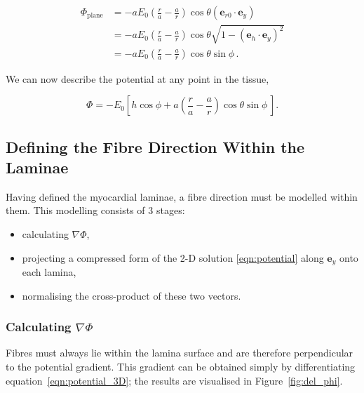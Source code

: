  \begin{align}
    \Phi_{\text{plane}} &= -aE_0\left( \frac{r}{a} - \frac{a}{r} \right) \cos \theta \left(\mathbf{e}_{r0} \cdot \mathbf{e}_y \right) \\
    &= -aE_0\left( \frac{r}{a} - \frac{a}{r} \right) \cos \theta \sqrt{ 1 - \left( \mathbf{e}_h \cdot \mathbf{e}_y \right)^2 } \\
    &= -aE_0\left( \frac{r}{a} - \frac{a}{r} \right) \cos \theta \sin \phi \, .
  \end{align}
  
  We can now describe the potential at any point in the tissue,
  
  \begin{equation}
    \Phi = -E_0\left[ h \cos \phi + a \left( \frac{r}{a} - \frac{a}{r} \right) \cos \theta \sin \phi \, \right].
    \label{eqn:potential_3D}
  \end{equation}
  

\subsection{Defining the Fibre Direction Within the Laminae}
\label{sec:defining_the_fibre_direction_within_the_laminae}
  Having defined the myocardial laminae, a fibre direction must be modelled within them. This modelling consists of 3 stages:
  
  \begin{itemize}
    \item calculating $\nabla\Phi$,
    \item projecting a compressed form of the 2-D solution \ref{eqn:potential} along $\mathbf{e}_y$ onto each lamina,
    \item normalising the cross-product of these two vectors.
  \end{itemize}
  
  \subsubsection{Calculating $\nabla\Phi$}
  \label{sub:calculating_nablaphi}
    Fibres must always lie within the lamina surface and are therefore perpendicular to the potential gradient. This gradient can be obtained simply by differentiating equation~\ref{eqn:potential_3D}; the results are visualised in Figure~\ref{fig:del_phi}.
    
